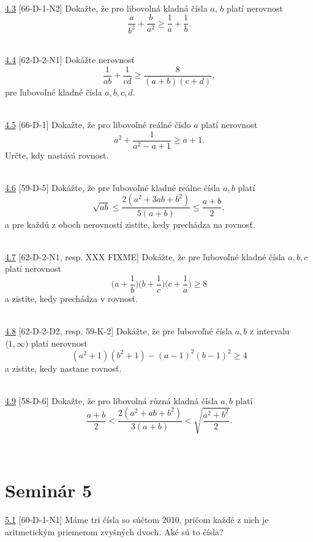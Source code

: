 \\

\noindent \ul{4.3} [66-D-1-N2] Dokažte, že pro libovolná kladná čísla $a$, $b$ platí nerovnost
$$\frac{a}{b^2}+ \frac{b}{a^2}\geq \frac{1}{a} + \frac{1}{b}.$$


\\

\noindent \ul{4.4} [62-D-2-N1] Dokážte nerovnosť $$\frac{1}{ab}+\frac{1}{cd}\geq \frac{8}{(a+b)(c+d)},$$ pre ľubovoľné kladné čísla $a, b, c, d$.


\\

\noindent \ul{4.5} [66-D-1] Dokažte, že pro libovolné reálné číslo $a$ platí nerovnost $$a^2+\frac{1}{a^2-a+1}\geq a+1.$$ Určte, kdy nastává rovnost.


\\

\noindent \ul{4.6} [59-D-5] Dokážte, že pre ľubovoľné kladné reálne čísla $a, b$ platí
$$ \sqrt{ab}\leq \frac{2(a^2+3ab+b^2)}{5(a+b)}\leq \frac{a+b}{2},$$
a pre každú z oboch nerovností zistite, kedy prechádza na rovnosť.


\\

\noindent \ul{4.7} [62-D-2-N1, resp. XXX FIXME]
Dokážte, že pre ľubovoľné kladné čísla $a, b, c$ platí nerovnost
$$\bigg(a +\frac{1}{b}\bigg)\bigg(b+\frac{1}{c}\bigg)\bigg(c+\frac{1}{a}\bigg)\geq 8$$
a zistite, kedy prechádza v rovnosť.


\\

\noindent \ul{4.8} [62-D-2-D2, resp. 59-K-2]
Dokážte, že pre ľubovoľné čísla $a, b$ z intervalu $\langle 1, \infty)$ platí nerovnost
$$ (a^2 + 1)(b^2 + 1) - (a - 1)^2 (b - 1)^2 \geq 4$$
a zistite, kedy nastane rovnosť.


\\

\noindent \ul{4.9} [58-D-6]
Dokažte, že pro libovolná různá kladná čísla $a, b$ platí
$$\frac{a+b}{2}<\frac{2(a^2 + ab + b^2 )}{3(a+b)}<\sqrt{\frac{a^2+b^2}{2}}.$$


\\

\section*{Seminár 5}

\noindent \ul{5.1} [60-D-1-N1] Máme tri čísla so súčtom 2010, pričom každé z nich je aritmetickým priemerom zvyšných dvoch. Aké sú to čísla?


